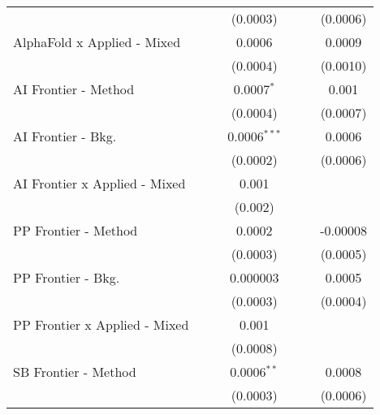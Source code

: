 \begin{tabular}{lcccccc}
                                 &               &          & (0.0003)       &          &              & (0.0006)\\   
   AlphaFold x Applied - Mixed   &               &          & 0.0006         &          &              & 0.0009\\   
                                 &               &          & (0.0004)       &          &              & (0.0010)\\   
   AI Frontier - Method          &               &          & 0.0007$^{*}$   &          &              & 0.001\\   
                                 &               &          & (0.0004)       &          &              & (0.0007)\\   
   AI Frontier - Bkg.            &               &          & 0.0006$^{***}$ &          &              & 0.0006\\   
                                 &               &          & (0.0002)       &          &              & (0.0006)\\   
   AI Frontier x Applied - Mixed &               &          & 0.001          &          &              &   \\   
                                 &               &          & (0.002)        &          &              &   \\   
   PP Frontier - Method          &               &          & 0.0002         &          &              & -0.00008\\   
                                 &               &          & (0.0003)       &          &              & (0.0005)\\   
   PP Frontier - Bkg.            &               &          & 0.000003       &          &              & 0.0005\\   
                                 &               &          & (0.0003)       &          &              & (0.0004)\\   
   PP Frontier x Applied - Mixed &               &          & 0.001          &          &              &   \\   
                                 &               &          & (0.0008)       &          &              &   \\   
   SB Frontier - Method          &               &          & 0.0006$^{**}$  &          &              & 0.0008\\   
                                 &               &          & (0.0003)       &          &              & (0.0006)\\   

\end{tabular}
